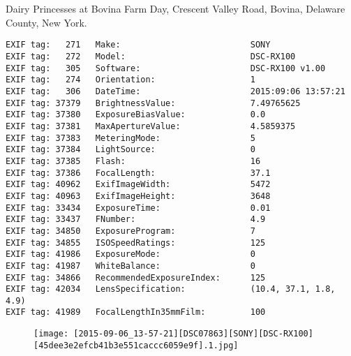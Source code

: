 \section{\protect{}}
\noindent Dairy Princesses at Bovina Farm Day, Crescent Valley Road, Bovina, Delaware County, New York.
\noindent
\begin{lstlisting}
EXIF tag:   271   Make:                          SONY
EXIF tag:   272   Model:                         DSC-RX100
EXIF tag:   305   Software:                      DSC-RX100 v1.00
EXIF tag:   274   Orientation:                   1
EXIF tag:   306   DateTime:                      2015:09:06 13:57:21
EXIF tag: 37379   BrightnessValue:               7.49765625
EXIF tag: 37380   ExposureBiasValue:             0.0
EXIF tag: 37381   MaxApertureValue:              4.5859375
EXIF tag: 37383   MeteringMode:                  5
EXIF tag: 37384   LightSource:                   0
EXIF tag: 37385   Flash:                         16
EXIF tag: 37386   FocalLength:                   37.1
EXIF tag: 40962   ExifImageWidth:                5472
EXIF tag: 40963   ExifImageHeight:               3648
EXIF tag: 33434   ExposureTime:                  0.01
EXIF tag: 33437   FNumber:                       4.9
EXIF tag: 34850   ExposureProgram:               7
EXIF tag: 34855   ISOSpeedRatings:               125
EXIF tag: 41986   ExposureMode:                  0
EXIF tag: 41987   WhiteBalance:                  0
EXIF tag: 34866   RecommendedExposureIndex:      125
EXIF tag: 42034   LensSpecification:             (10.4, 37.1, 1.8, 4.9)
EXIF tag: 41989   FocalLengthIn35mmFilm:         100

\end{lstlisting}
\clearpage
\begin{figure}
\raggedleft
\texttt{[image: [2015-09-06\_13-57-21][DSC07863][SONY][DSC-RX100][45dee3e2efcb41b3e551caccc6059e9f].1.jpg]}
\end{figure}


\clearpage
